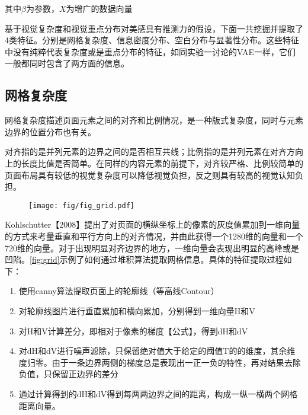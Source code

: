 其中$\beta$为参数，$X$为增广的数据向量

基于视觉复杂度和视觉重点分布对美感具有推测力的假设，下面一共挖掘并提取了4类特征。分别是网格复杂度、信息密度分布、空白分布与显著性分布。这些特征中没有纯粹代表复杂度或是重点分布的特征，如同实验一讨论的VAE一样，它们一般都同时包含了两方面的信息。

\subsection{网格复杂度}
网格复杂度描述页面元素之间的对齐和比例情况，是一种版式复杂度，同时与元素边界的位置分布也有关。

对齐指的是并列元素的边界之间的是否相互共线；比例指的是并列元素在对齐方向上的长度比值是否简单。在同样的内容元素的前提下，对齐较严格、比例较简单的页面布局具有较低的视觉复杂度可以降低视觉负担，反之则具有较高的视觉认知负担。

\begin{figure}[H]
  \texttt{[image: fig/fig\_grid.pdf]}
\end{figure}

Kohlschutter【2008】提出了对页面的横纵坐标上的像素的灰度值累加到一维向量的方式来考量垂直和平行方向上的对齐情况，并由此获得一个1280维的向量和一个720维的向量。对于出现明显对齐边界的地方，一维向量会表现出明显的高峰或是凹陷。\ref{fig:grid}示例了如何通过堆积算法提取网格信息。具体的特征提取过程如下：

\begin{enumerate}
  \item 使用canny算法提取页面上的轮廓线（等高线Contour）
  \item 对轮廓线图片进行垂直累加和横向累加，分别得到一维向量H和V
  \item 对H和V计算差分，即相对于像素的梯度【公式】，得到dH和dV
  \item 对dH和dV进行噪声滤除，只保留绝对值大于给定的阈值T的的维度，其余维度归零。由于一条边界两侧的梯度总是表现出一正一负的特性，再对结果去除负值，只保留正边界的差分
  \item 通过计算得到的dH和dV得到每两两边界之间的距离，构成一纵一横两个网格距离向量。
\end{enumerate}

